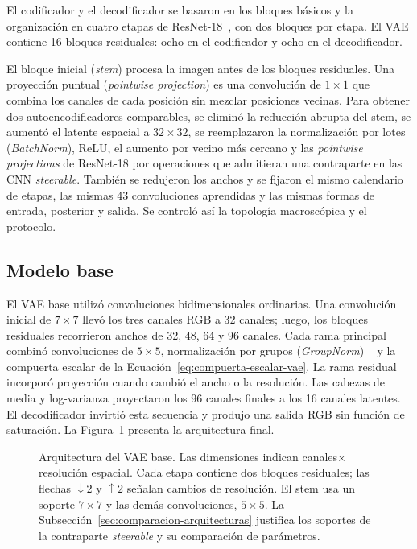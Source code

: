 El codificador y el decodificador se basaron en los bloques básicos y la
organización en cuatro etapas de ResNet-18~\cite{he_deep_2016}, con dos bloques
por etapa. El VAE contiene 16 bloques residuales: ocho en el codificador y ocho
en el decodificador.

El bloque inicial (\emph{stem}) procesa la imagen antes de los bloques
residuales. Una proyección puntual (\emph{pointwise projection}) es una
convolución de \(1\times1\) que combina los canales de cada posición sin
mezclar posiciones vecinas. Para obtener dos autoencodificadores comparables, se eliminó la reducción
abrupta del stem, se aumentó el latente espacial a \(32\times32\), se
reemplazaron la normalización por lotes (\emph{BatchNorm}), ReLU,
el aumento por vecino más cercano y las
\emph{pointwise projections} de ResNet-18 por operaciones que admitieran una
contraparte en las CNN \emph{steerable}. También se redujeron los anchos
y se fijaron el mismo calendario de etapas, las mismas 43 convoluciones
aprendidas y las mismas formas de entrada, posterior y salida. Se controló así
la topología macroscópica y el protocolo.

\subsection{Modelo base}

El VAE base utilizó convoluciones bidimensionales ordinarias. Una convolución
inicial de \(7\times7\) llevó los tres canales RGB a 32 canales; luego, los
bloques residuales recorrieron anchos de 32, 48, 64 y 96 canales. Cada rama
    principal combinó convoluciones de \(5\times5\), normalización por grupos (\emph{GroupNorm})
    ~\cite{wu_groupnorm_2018} y la
compuerta escalar de la Ecuación~\eqref{eq:compuerta-escalar-vae}. La rama
residual incorporó proyección cuando cambió el ancho o la resolución. Las
cabezas de media y log-varianza proyectaron los 96 canales finales a los 16
canales latentes. El decodificador invirtió esta secuencia y produjo una salida
RGB sin función de saturación. La Figura~\ref{fig:arquitectura-vae-base}
presenta la arquitectura final.

\begin{figure}[htbp]
    \centering
    \resizebox{\textwidth}{!}{}
    \caption[Arquitectura del VAE base.]{Arquitectura del VAE base. Las dimensiones indican
    canales\(\times\)resolución espacial. Cada etapa contiene dos bloques
    residuales; las flechas \(\downarrow2\) y \(\uparrow2\) señalan cambios de
    resolución. El stem usa un soporte \(7\times7\) y las demás
    convoluciones, \(5\times5\). La Subsección~\ref{sec:comparacion-arquitecturas}
    justifica los soportes de la contraparte \emph{steerable} y su comparación
    de parámetros.}
    \label{fig:arquitectura-vae-base}
\end{figure}

